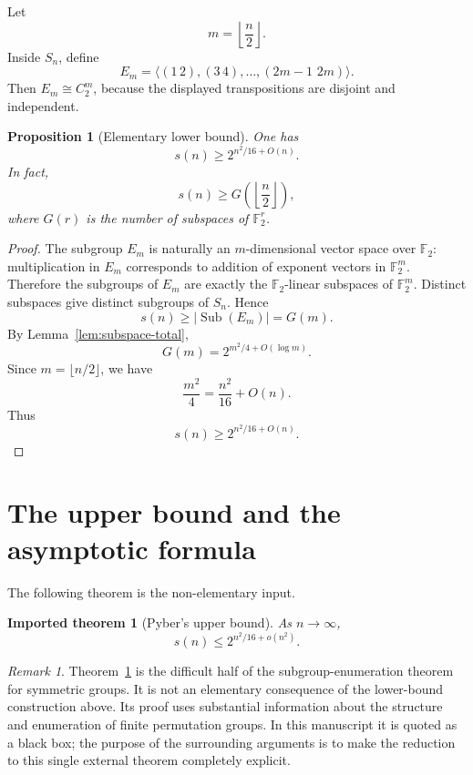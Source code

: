\documentclass[a4paper,11pt]{amsart}
\newtheorem{proposition}[theorem]{Proposition}
\newtheorem{importedtheorem}[theorem]{Imported theorem}
\theoremstyle{remark}
\newtheorem{remark}[theorem]{Remark}
\newcommand{\Sub}{\operatorname{Sub}}
\newcommand{\F}{\mathbb F}
\begin{document}
Let
\[
        m=\left\lfloor \frac n2\right\rfloor.
\]
Inside \(S_n\), define
\[
        E_m=\langle (1\,2),(3\,4),\ldots,(2m-1\,\,2m)\rangle.
\]
Then \(E_m\cong C_2^m\), because the displayed transpositions are disjoint and independent.

\begin{proposition}[Elementary lower bound]\label{prop:lower}
One has
\[
        s(n)\geq 2^{n^2/16+O(n)}.
\]
In fact,
\[
        s(n)\geq G\left(\left\lfloor \frac n2\right\rfloor\right),
\]
where \(G(r)\) is the number of subspaces of \(\F_2^r\).
\end{proposition}

\begin{proof}
The subgroup \(E_m\) is naturally an \(m\)-dimensional vector space over \(\F_2\): multiplication
in \(E_m\) corresponds to addition of exponent vectors in \(\F_2^m\). Therefore the subgroups of
\(E_m\) are exactly the \(\F_2\)-linear subspaces of \(\F_2^m\). Distinct subspaces give distinct
subgroups of \(S_n\). Hence
\[
        s(n)\geq |\Sub(E_m)|=G(m).
\]
By Lemma~\ref{lem:subspace-total},
\[
        G(m)=2^{m^2/4+O(\log m)}.
\]
Since \(m=\lfloor n/2\rfloor\), we have
\[
        \frac{m^2}{4}=\frac{n^2}{16}+O(n).
\]
Thus
\[
        s(n)\geq 2^{n^2/16+O(n)}.
\]
\end{proof}

\section{The upper bound and the asymptotic formula}

The following theorem is the non-elementary input.

\begin{importedtheorem}[Pyber's upper bound]\label{thm:pyber-upper}
As \(n\to\infty\),
\[
        s(n)\leq 2^{n^2/16+o(n^2)}.
\]
\end{importedtheorem}

\begin{remark}
Theorem~\ref{thm:pyber-upper} is the difficult half of the subgroup-enumeration theorem for
symmetric groups. It is not an elementary consequence of the lower-bound construction above. Its
proof uses substantial information about the structure and enumeration of finite permutation
groups. In this manuscript it is quoted as a black box; the purpose of the surrounding arguments is
to make the reduction to this single external theorem completely explicit.
\end{remark}
\end{document}
